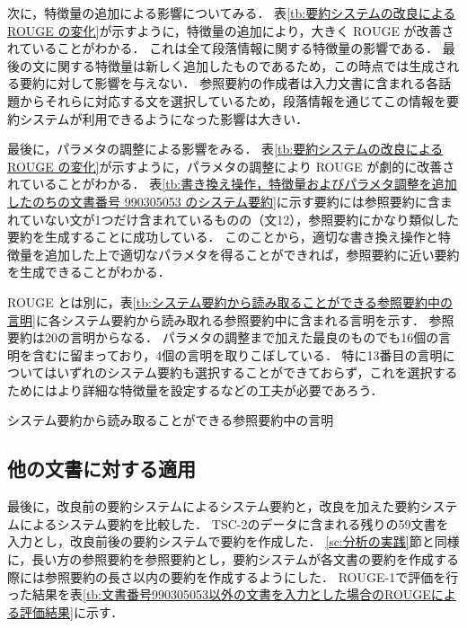 次に，特徴量の追加による影響についてみる．
表\ref{tb:要約システムの改良による ROUGE の変化}が示すように，特徴量の追加により，大きく ROUGE が改善されていることがわかる．
これは全て段落情報に関する特徴量の影響である．
最後の文に関する特徴量は新しく追加したものであるため，この時点では生成される要約に対して影響を与えない．
参照要約の作成者は入力文書に含まれる各話題からそれらに対応する文を選択しているため，段落情報を通じてこの情報を要約システムが利用できるようになった影響は大きい．

最後に，パラメタの調整による影響をみる．
表\ref{tb:要約システムの改良による ROUGE の変化}が示すように，パラメタの調整により ROUGE が劇的に改善されていることがわかる．
表\ref{tb:書き換え操作，特徴量およびパラメタ調整を追加したのちの文書番号 990305053 のシステム要約}に示す要約には参照要約に含まれていない文が1つだけ含まれているものの（文12），参照要約にかなり類似した要約を生成することに成功している．
このことから，適切な書き換え操作と特徴量を追加した上で適切なパラメタを得ることができれば，参照要約に近い要約を生成できることがわかる．

ROUGE とは別に，表\ref{tb:システム要約から読み取ることができる参照要約中の言明}に各システム要約から読み取れる参照要約中に含まれる言明を示す．
参照要約は20の言明からなる．
パラメタの調整まで加えた最良のものでも16個の言明を含むに留まっており，4個の言明を取りこぼしている．
特に13番目の言明についてはいずれのシステム要約も選択することができておらず，これを選択するためにはより詳細な特徴量を設定するなどの工夫が必要であろう．

\begin{table}[b]
\caption{システム要約から読み取ることができる参照要約中の言明}
\label{tb:システム要約から読み取ることができる参照要約中の言明}

\end{table}


\subsection{他の文書に対する適用}
\label{sc:他の文書に対する適用}

最後に，改良前の要約システムによるシステム要約と，改良を加えた要約システムによるシステム要約を比較した．
TSC-2のデータに含まれる残りの59文書を入力とし，改良前後の要約システムで要約を作成した．
\ref{sc:分析の実践}節と同様に，長い方の参照要約を参照要約とし，要約システムが各文書の要約を作成する際には参照要約の長さ以内の要約を作成するようにした．
ROUGE-1で評価を行った結果を表\ref{tb:文書番号990305053以外の文書を入力とした場合のROUGEによる評価結果}に示す．

